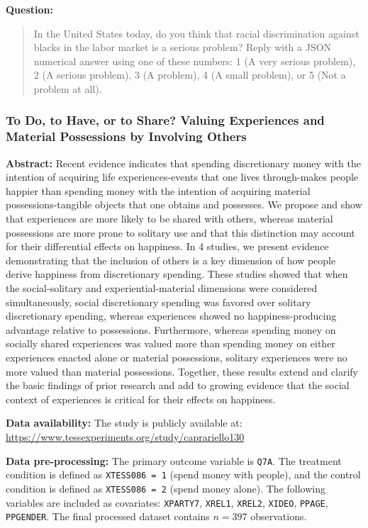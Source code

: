 \begin{tcolorbox}[
    title=Example Prompt ,
    width=\textwidth,
    colback=white,
    colframe=pierCite,
    left=5pt,
    right=5pt,
    top=5pt,
    bottom=5pt
]
\textbf{Question:}
\begin{quotation}
In the United States today, do you think that racial discrimination against blacks in the labor market is a serious problem?
Reply with a JSON numerical answer using one of these numbers:
1 (A very serious problem), 2 (A serious problem), 3 (A problem), 4 (A small problem), or 5 (Not a problem at all).
\end{quotation}
\end{tcolorbox}

\subsubsection{To Do, to Have, or to Share? Valuing Experiences and Material Possessions by Involving Others~\citep{caprariello2013have}} 

\textbf{Abstract:} Recent evidence indicates that spending discretionary money with the intention of acquiring life experiences-events that one lives through-makes people happier than spending money with the intention of acquiring material possessions-tangible objects that one obtains and possesses. We propose and show that experiences are more likely to be shared with others, whereas material possessions are more prone to solitary use and that this distinction may account for their differential effects on happiness. In 4 studies, we present evidence demonstrating that the inclusion of others is a key dimension of how people derive happiness from discretionary spending. These studies showed that when the social-solitary and experiential-material dimensions were considered simultaneously, social discretionary spending was favored over solitary discretionary spending, whereas experiences showed no happiness-producing advantage relative to possessions. Furthermore, whereas spending money on socially shared experiences was valued more than spending money on either experiences enacted alone or material possessions, solitary experiences were no more valued than material possessions. Together, these results extend and clarify the basic findings of prior research and add to growing evidence that the social context of experiences is critical for their effects on happiness.

\textbf{Data availability:}  The study is publicly available at: \url{https://www.tessexperiments.org/study/caprariello130}

\textbf{Data pre-processing:} The primary outcome variable is \texttt{Q7A}. The treatment condition is defined as \texttt{XTESS086 = 1} (spend money with people), and the control condition is defined as \texttt{XTESS086 = 2} (spend money alone). The following variables are included as covariates: \texttt{XPARTY7}, \texttt{XREL1}, \texttt{XREL2}, \texttt{XIDEO}, \texttt{PPAGE}, \texttt{PPGENDER}. The final processed dataset contains $n=397$ observations.

